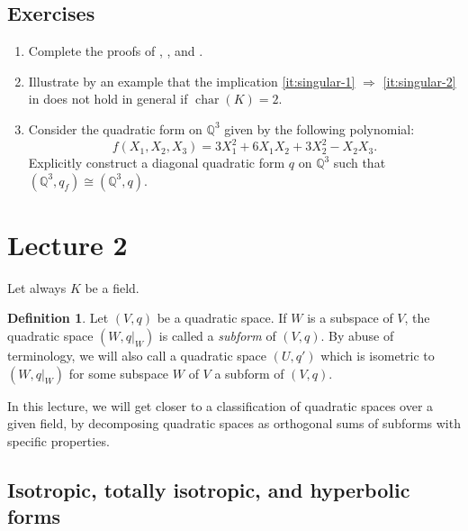 \documentclass[12pt, leqno, british]{amsart}
\theoremstyle{definition}
\newtheorem{defi}{Definition}[subsection]
\theoremstyle{plain}
\theoremstyle{remark}
\newcommand{\mbb}{\mathbb}
\newcommand{\qq}{\mbb Q}
\DeclareMathOperator{\charac}{char}
\begin{document}
\subsection{Exercises}
\begin{enumerate}
\item Complete the proofs of , ,  and .
\item Illustrate by an example that the implication \eqref{it:singular-1} $\Rightarrow$ \eqref{it:singular-2} in  does not hold in general if $\charac(K) = 2$.
\item Consider the quadratic form on $\qq^3$ given by the following polynomial:
$$f(X_1, X_2, X_3) = 3X_1^2 + 6X_1X_2 + 3X_2^2 - X_2X_3.$$
Explicitly construct a diagonal quadratic form $q$ on $\qq^3$ such that $(\qq^3, q_f) \cong (\qq^3, q)$.
\end{enumerate}

\section{Lecture 2}
Let always $K$ be a field.
\begin{defi}
Let $(V, q)$ be a quadratic space.
If $W$ is a subspace of $V$, the quadratic space $(W, q\vert_W)$ is called a \emph{subform} of $(V, q)$.
By abuse of terminology, we will also call a quadratic space $(U, q')$ which is isometric to $(W, q\vert_W)$ for some subspace $W$ of $V$ a subform of $(V, q)$.
\end{defi}
In this lecture, we will get closer to a classification of quadratic spaces over a given field, by decomposing quadratic spaces as orthogonal sums of subforms with specific properties.

\subsection{Isotropic, totally isotropic, and hyperbolic forms}
\end{document}
